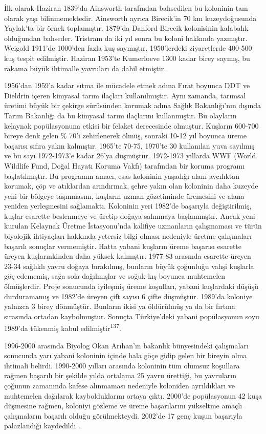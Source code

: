 \documentclass[
  letterpaper,
  DIV=11,
  numbers=noendperiod]{scrreprt}
\begin{document}
İlk olarak Haziran 1839'da Ainsworth tarafından bahsedilen bu koloninin
tam olarak yaşı bilinmemektedir. Ainsworth ayrıca Birecik'in 70 km
kuzeydoğusunda Yaylak'ta bir örnek toplamıştır. 1879'da Danford Birecik
kolonisinin kalabalık olduğundan bahseder. Tristram da iki yıl sonra bu
koloni hakkında yazmıştır. Weigold 1911'de 1000'den fazla kuş saymıştır.
1950'lerdeki ziyaretlerde 400-500 kuş tespit edilmiştir. Haziran 1953'te
Kumerloeve 1300 kadar birey saymış, bu rakama büyük ihtimalle yavruları
da dahil etmiştir.

1956'dan 1959'a kadar sıtma ile mücadele etmek adına Fırat boyunca DDT
ve Dieldrin içeren kimyasal tarım ilaçları kullanılmıştır. Aynı zamanda,
tarımsal üretimi büyük bir çekirge sürüsünden korumak adına Sağlık
Bakanlığı'nın dışında Tarım Bakanlığı da bu kimyasal tarım ilaçlarını
kullanmıştır. Bu olayların kelaynak popülasyonuna etkisi bir felaket
derecesinde olmuştur. Kuşların 600-700 bireye denk gelen \% 70'i
zehirlenerek ölmüş, sonraki 10-12 yıl boyunca üreme başarısı sıfıra
yakın kalmıştır. 1965'te 70-75, 1970'te 30 kullanılan yuva sayılmış ve
bu sayı 1972-1973'e kadar 26'ya düşmüştür. 1972-1973 yıllarda WWF (World
Wildlife Fund, Doğal Hayatı Koruma Vakfı) tarafından bir koruma programı
başlatılmıştır. Bu programın amacı, esas koloninin yaşadığı alanı
avcılıktan korumak, çöp ve atıklardan arındırmak, şehre yakın olan
koloninin daha kuzeyde yeni bir bölgeye taşınmasını, kuşların uzman
gözetiminde üremesini ve alana yeniden yerleşmesini sağlamaktı.
Koloninin yeri 1982'de başarıyla değiştirilmiş, kuşlar esarette
beslenmeye ve üretip doğaya salınmaya başlanmıştır. Ancak yeni kurulan
Kelaynak Üretme İstasyonu'nda kalifiye uzmanların çalışmaması ve türün
biyolojik ihtiyaçları hakkında yetersiz bilgi olması nedeniyle üretme
çalışmaları başarılı sonuçlar vermemiştir. Hatta yabani kuşların üreme
başarısı esarette üreyen kuşlarınkinden daha yüksek kalmıştır. 1977-83
arasında esarette üreyen 23-34 sağlıklı yavru doğaya bırakılmış,
bunların büyük çoğunluğu vahşi kuşlarla göç edememiş, sağa sola
dağılmışlar ve soğuk kış boyunca muhtemelen ölmüşlerdir. Proje sonucunda
iyileşmiş üreme koşulları, yabani kuşlardaki düşüşü durduramamış ve
1982'de üreyen çift sayısı 6 çifte düşmüştür. 1989'da koloniye yalnızca
3 birey dönmüştür. Bunların ikisi ya öldürülmüş ya da bir fırtına
sırasında ortadan kaybolmuştur. Sonuçta Türkiye'deki yabani popülasyonun
soyu 1989'da tükenmiş kabul edilmiştir\textsuperscript{137}.

1996-2000 arasında Biyolog Okan Arıhan'ın bakanlık bünyesindeki
çalışmaları sonucunda yarı yabani koloninin içinde hala göçe gidip gelen
bir bireyin olma ihtimali belirdi. 1990-2000 yılları arasında koloninin
tüm olumsuz koşullara rağmen başarılı bir şekilde yılda ortalama 25
yavru ürettiği, bu yavruların çoğunun zamanında kafese alınmaması
nedeniyle koloniden ayrıldıkları ve muhtemelen dağılarak kaybolduklarını
ortaya çıktı. 2000'de popülasyonun 42 kuşa düşmesine rağmen, koloniyi
gözleme ve üreme başarılarını yükseltme amaçlı çalışmaların başarılı
olduğu görülmekteydi. 2002'de 17 genç kuşun başarıyla palazlandığı
kaydedildi .
\end{document}
